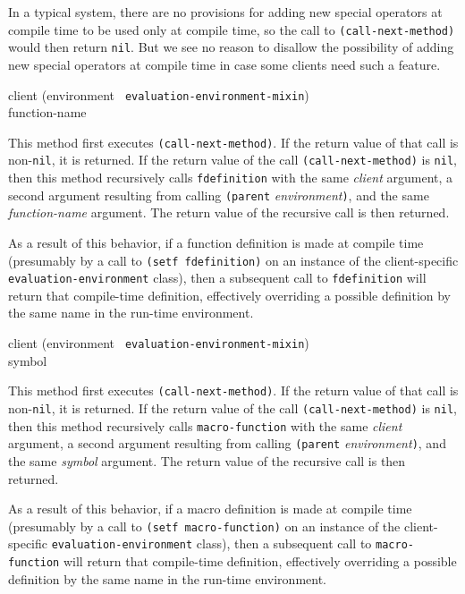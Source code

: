 In a typical system, there are no provisions for adding new special
operators at compile time to be used only at compile time, so the call
to \texttt{(call-next-method)} would then return \texttt{nil}.  But we
see no reason to disallow the possibility of adding new special
operators at compile time in case some clients need such a feature.

{\small{} {client (environment {\tt
      evaluation-environment-mixin}) \\ function-name}
}

This method first executes \texttt{(call-next-method)}.  If the return
value of that call is non-\texttt{nil}, it is returned.  If the return
value of the call \texttt{(call-next-method)} is \texttt{nil}, then
this method recursively calls \texttt{fdefinition} with the same
\textit{client} argument, a second argument resulting from calling
\texttt{(parent} \textit{environment}\texttt{)}, and the same
\textit{function-name} argument.  The return value of the recursive
call is then returned.

As a result of this behavior, if a function definition is made at
compile time (presumably by a call to \texttt{(setf fdefinition)} on
an instance of the client-specific \texttt{evaluation-environment}
class), then a subsequent call to \texttt{fdefinition} will return
that compile-time definition, effectively overriding a possible
definition by the same name in the run-time environment.

{\small{} {client (environment {\tt
      evaluation-environment-mixin}) \\ symbol}
}

This method first executes \texttt{(call-next-method)}.  If the return
value of that call is non-\texttt{nil}, it is returned.  If the return
value of the call \texttt{(call-next-method)} is \texttt{nil}, then
this method recursively calls \texttt{macro-function} with the same
\textit{client} argument, a second argument resulting from calling
\texttt{(parent} \textit{environment}\texttt{)}, and the same
\textit{symbol} argument.  The return value of the recursive
call is then returned.

As a result of this behavior, if a macro definition is made at compile
time (presumably by a call to \texttt{(setf macro-function)} on an
instance of the client-specific \texttt{evaluation-environment}
class), then a subsequent call to \texttt{macro-function} will return
that compile-time definition, effectively overriding a possible
definition by the same name in the run-time environment.

